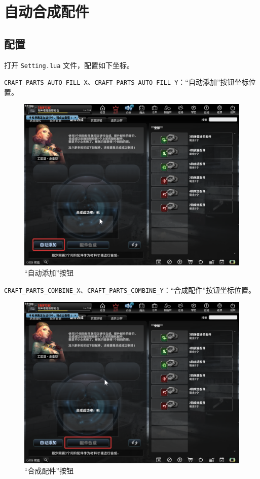 \section{自动合成配件}

\subsection{配置}

打开 \lstinline{Setting.lua} 文件，配置如下坐标。

\lstinline{CRAFT_PARTS_AUTO_FILL_X}、\lstinline{CRAFT_PARTS_AUTO_FILL_Y}：“自动添加”按钮坐标位置。

\begin{figure}[H]
    \Centering
    \includegraphics[width=\textwidth]{docs/assets/auto_fill.png}
    \caption{“自动添加”按钮}
\end{figure}

\lstinline{CRAFT_PARTS_COMBINE_X}、\lstinline{CRAFT_PARTS_COMBINE_Y}：“合成配件”按钮坐标位置。

\begin{figure}[H]
    \Centering
    \includegraphics[width=\textwidth]{docs/assets/combine.png}
    \caption{“合成配件”按钮}
\end{figure}

